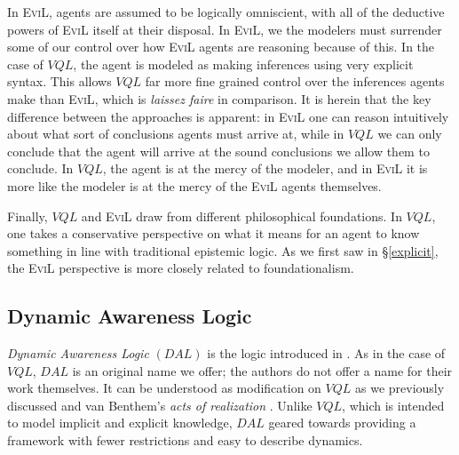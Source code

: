  In \textsc{EviL}, agents are assumed
to be logically omniscient, with all of the deductive powers of
\textsc{EviL} itself at their disposal.  In \textsc{EviL}, we the 
modelers must surrender some of our control
over how \textsc{EviL} agents are reasoning because of this.  In the
case of $VQL$, the agent is modeled as making inferences using 
very explicit syntax.  This allows $VQL$ far more fine grained control
over the inferences agents make than \textsc{EviL}, which is
\emph{laissez faire} in comparison.  It is herein that the key
difference between the approaches is apparent: in \textsc{EviL} one
can reason intuitively about what sort of conclusions agents must
arrive at, while in $VQL$ we can only conclude that the agent will
arrive at the sound conclusions we allow them to conclude.
In $VQL$, the agent is at the mercy of the modeler, and in
\textsc{EviL} it is more like the modeler is at the mercy of 
the \textsc{EviL} agents themselves.


Finally, $VQL$ and \textsc{EviL} draw from different philosophical
foundations. In $VQL$, one takes a conservative perspective on what it means for an
agent to know something in line with traditional epistemic logic.  As
we first saw in \S\ref{explicit}, the \textsc{EviL} perspective is more
closely related to foundationalism.


\subsection{Dynamic Awareness Logic}

\emph{Dynamic Awareness Logic} $(DAL)$ is the logic introduced in
\cite{van_benthem_inference_2009}.  As in the case of $VQL$, $DAL$ is
an original name we offer; the authors do not offer a name for their
work themselves.  It can be understood as modification on $VQL$ as we
previously
 discussed and  van Benthem's \emph{acts of realization}
\cite{van_benthem_inference_2009}.  Unlike $VQL$, which is intended to
model implicit and explicit knowledge, $DAL$ geared towards providing
a framework with fewer restrictions and easy to describe dynamics. 

